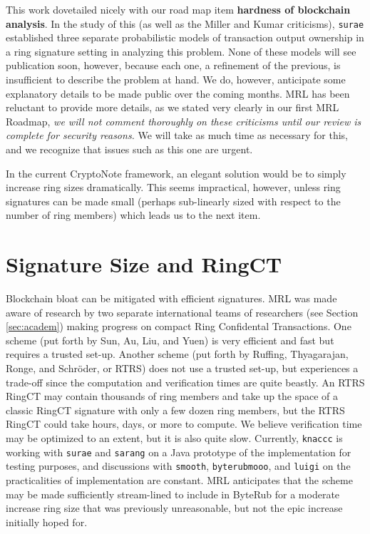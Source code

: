\documentclass[12pt,english]{mrl}
\theoremstyle{definition}
\numberwithin{equation}{section}
\numberwithin{figure}{section}
\numberwithin{equation}{section}
\numberwithin{equation}{section}
\numberwithin{figure}{section}
\begin{document}
This work dovetailed nicely with our road map item \textbf{hardness of blockchain analysis}.  In the study of this (as well as the Miller and Kumar criticisms), \texttt{surae} established three separate probabilistic models of transaction output ownership in a ring signature setting in analyzing this problem. None of these models will see publication soon, however, because each one, a refinement of the previous, is insufficient to describe the problem at hand. We do, however, anticipate some explanatory details to be made public over the coming months. MRL has been reluctant to provide more details, as we stated very clearly in our first MRL Roadmap, \emph{we will not comment thoroughly on these criticisms until our review is complete for security reasons.} We will take as much time as necessary for this, and we recognize that issues such as this one are urgent.
    
In the current CryptoNote framework, an elegant solution would be to simply increase ring sizes dramatically. This seems impractical, however, unless ring signatures can be made small (perhaps sub-linearly sized with respect to the number of ring members) which leads us to the next item.
    
\section{Signature Size and RingCT}

Blockchain bloat can be mitigated with efficient signatures. MRL was made aware of research by two separate international teams of researchers (see Section \ref{sec:academ}) making progress on compact Ring Confidental Transactions. One scheme (put forth by Sun, Au, Liu, and Yuen) is very efficient and fast but requires a trusted set-up. Another scheme (put forth by Ruffing,  Thyagarajan, Ronge, and Schr{\"o}der, or RTRS) does not use a trusted set-up, but experiences a trade-off since the computation and verification times are quite beastly. An RTRS RingCT may contain thousands of ring members and take up the space of a classic RingCT signature with only a few dozen ring members, but the RTRS RingCT could take hours, days, or more to compute. We believe verification time may be optimized to an extent, but it is also quite slow. Currently, \texttt{knaccc} is working with \texttt{surae} and \texttt{sarang} on a Java prototype of the implementation for testing purposes, and discussions with \texttt{smooth}, \texttt{byterubmooo}, and \texttt{luigi} on the practicalities of implementation are constant. MRL anticipates that the scheme may be made sufficiently stream-lined to include in ByteRub for a moderate increase ring size that was previously unreasonable, but not the epic increase initially hoped for.
    
\end{document}
